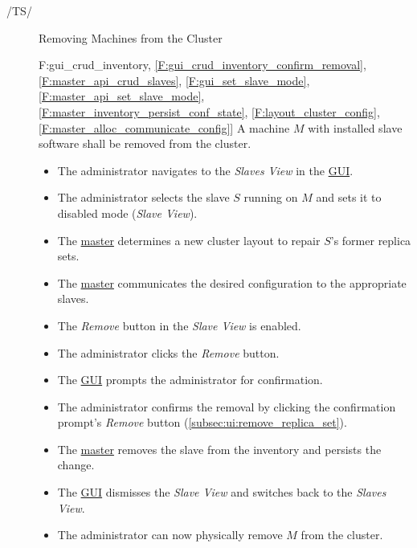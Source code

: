 \documentclass[a4paper, 11pt]{article}
\makeatletter
\def\namedlabel#1#2{\begingroup
    #2%
    \def\@currentlabel{#2}%
    \phantomsection\label{#1}\endgroup
}
\newcommand{\oitem}[2]{
  \@ifundefined{c@oitem#1}{\newcounter{oitem#1}}{} %
  \addtocounter{oitem#1}{10}
  \item[\namedlabel{#1:#2}{/#1\arabic{oitem#1}/}]
}
\newcommand{\testsequence}[3][]{
	\begin{description}[leftmargin=!,labelwidth=\widthof{\bfseries Preconditions}]
		\ifthenelse{\equal{#1}{}}
		{} %
		{\item[Tests] #1}
		\item[Preconditions] #2
		\item[Steps] #3
	\end{description}
}
\makeatother
\begin{document}
\begin{description}
\oitem{TS}{} Removing Machines from the Cluster
\testsequence
[\ref{F:gui_crud_inventory}, \ref{F:gui_crud_inventory_confirm_removal}, \ref{F:master_api_crud_slaves}, \ref{F:gui_set_slave_mode}, \ref{F:master_api_set_slave_mode}, \ref{F:master_inventory_persist_conf_state}, \ref{F:layout_cluster_config}, \ref{F:master_alloc_communicate_config}]
{
	A machine $M$ with installed \gls{slave} software shall be removed from the cluster.
}
{
	\begin{itemize}
		\item The \gls{administrator} navigates to the \textit{Slaves View} in the \hyperref[SM:GUI]{GUI}.
		\item The \gls{administrator} selects the \gls{slave} $S$ running on $M$ and sets it to \gls{disabled mode} (\textit{Slave View}).
		\item The \hyperref[SM:Master]{master} determines a new \gls{cluster} layout to repair $S$'s former \glspl{replica set}.
		\item The \hyperref[SM:Master]{master} communicates the desired configuration to the appropriate \glspl{slave}.
		\item The \textit{Remove} button in the \textit{Slave View} is enabled.
		\item The \gls{administrator} clicks the \textit{Remove} button.
		\item The \hyperref[SM:GUI]{GUI} prompts the \gls{administrator} for confirmation.
		\item The \gls{administrator} confirms the removal by clicking the confirmation prompt's \textit{Remove} button (\ref{subsec:ui:remove_replica_set}).
		\item The \hyperref[SM:Master]{master} removes the slave from the \gls{inventory} and persists the change.
		\item The \hyperref[SM:GUI]{GUI} dismisses the \textit{Slave View} and switches back to the \textit{Slaves View}.
		\item The \gls{administrator} can now physically remove $M$ from the \gls{cluster}.
	\end{itemize}
}



\end{description}
\end{document}
